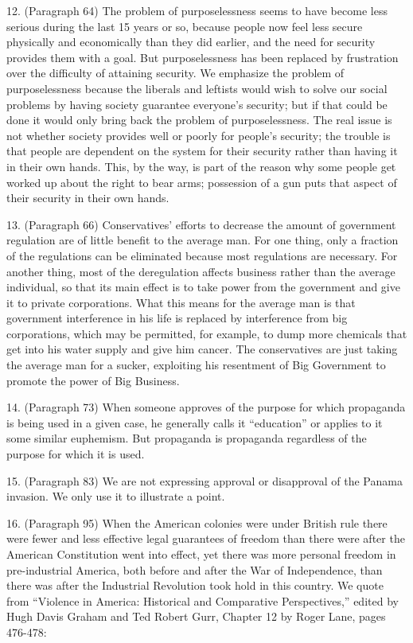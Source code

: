 12. (Paragraph 64) The problem of purposelessness seems to have become less serious during the last 15 years or so, because people now feel less secure physically and economically than they did earlier, and the need for security provides them with a goal. But purposelessness has been replaced by frustration over the difficulty of attaining security. We emphasize the problem of purposelessness because the liberals and leftists would wish to solve our social problems by having society guarantee everyone’s security; but if that could be done it would only bring back the problem of purposelessness. The real issue is not whether society provides well or poorly for people’s security; the trouble is that people are dependent on the system for their security rather than having it in their own hands. This, by the way, is part of the reason why some people get worked up about the right to bear arms; possession of a gun puts that aspect of their security in their own hands.

13. (Paragraph 66) Conservatives’ efforts to decrease the amount of government regulation are of little benefit to the average man. For one thing, only a fraction of the regulations can be eliminated because most regulations are necessary. For another thing, most of the deregulation affects business rather than the average individual, so that its main effect is to take power from the government and give it to private corporations. What this means for the average man is that government interference in his life is replaced by interference from big corporations, which may be permitted, for example, to dump more chemicals that get into his water supply and give him cancer. The conservatives are just taking the average man for a sucker, exploiting his resentment of Big Government to promote the power of Big Business.

14. (Paragraph 73) When someone approves of the purpose for which propaganda is being used in a given case, he generally calls it “education” or applies to it some similar euphemism. But propaganda is propaganda regardless of the purpose for which it is used.

15. (Paragraph 83) We are not expressing approval or disapproval of the Panama invasion. We only use it to illustrate a point.

16. (Paragraph 95) When the American colonies were under British rule there were fewer and less effective legal guarantees of freedom than there were after the American Constitution went into effect, yet there was more personal freedom in pre-industrial America, both before and after the War of Independence, than there was after the Industrial Revolution took hold in this country. We quote from “Violence in America: Historical and Comparative Perspectives,” edited by Hugh Davis Graham and Ted Robert Gurr, Chapter 12 by Roger Lane, pages 476-478:

